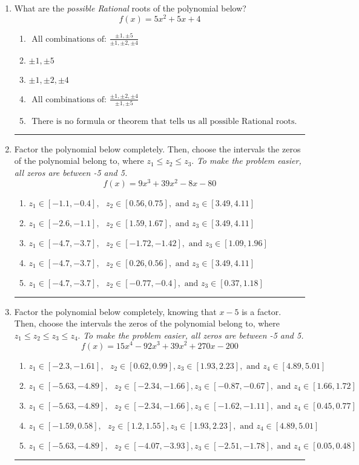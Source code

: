 \documentclass[14pt]{extbook}
\newcommand{\litem}[1]{\item#1\hspace*{-1cm}\rule{\textwidth}{0.4pt}}
\begin{document}
\begin{enumerate}
\litem{
What are the \textit{possible Rational} roots of the polynomial below?\[ f(x) = 5x^{2} +5 x + 4 \]\begin{enumerate}[label=\Alph*.]
\item \( \text{ All combinations of: }\frac{\pm 1,\pm 5}{\pm 1,\pm 2,\pm 4} \)
\item \( \pm 1,\pm 5 \)
\item \( \pm 1,\pm 2,\pm 4 \)
\item \( \text{ All combinations of: }\frac{\pm 1,\pm 2,\pm 4}{\pm 1,\pm 5} \)
\item \( \text{ There is no formula or theorem that tells us all possible Rational roots.} \)

\end{enumerate} }
\litem{
Factor the polynomial below completely. Then, choose the intervals the zeros of the polynomial belong to, where $z_1 \leq z_2 \leq z_3$. \textit{To make the problem easier, all zeros are between -5 and 5.}\[ f(x) = 9x^{3} +39 x^{2} -8 x -80 \]\begin{enumerate}[label=\Alph*.]
\item \( z_1 \in [-1.1, -0.4], \text{   }  z_2 \in [0.56, 0.75], \text{   and   } z_3 \in [3.49, 4.11] \)
\item \( z_1 \in [-2.6, -1.1], \text{   }  z_2 \in [1.59, 1.67], \text{   and   } z_3 \in [3.49, 4.11] \)
\item \( z_1 \in [-4.7, -3.7], \text{   }  z_2 \in [-1.72, -1.42], \text{   and   } z_3 \in [1.09, 1.96] \)
\item \( z_1 \in [-4.7, -3.7], \text{   }  z_2 \in [0.26, 0.56], \text{   and   } z_3 \in [3.49, 4.11] \)
\item \( z_1 \in [-4.7, -3.7], \text{   }  z_2 \in [-0.77, -0.4], \text{   and   } z_3 \in [0.37, 1.18] \)

\end{enumerate} }
\litem{
Factor the polynomial below completely, knowing that $x -5$ is a factor. Then, choose the intervals the zeros of the polynomial belong to, where $z_1 \leq z_2 \leq z_3 \leq z_4$. \textit{To make the problem easier, all zeros are between -5 and 5.}\[ f(x) = 15x^{4} -92 x^{3} +39 x^{2} +270 x -200 \]\begin{enumerate}[label=\Alph*.]
\item \( z_1 \in [-2.3, -1.61], \text{   }  z_2 \in [0.62, 0.99], z_3 \in [1.93, 2.23], \text{   and   } z_4 \in [4.89, 5.01] \)
\item \( z_1 \in [-5.63, -4.89], \text{   }  z_2 \in [-2.34, -1.66], z_3 \in [-0.87, -0.67], \text{   and   } z_4 \in [1.66, 1.72] \)
\item \( z_1 \in [-5.63, -4.89], \text{   }  z_2 \in [-2.34, -1.66], z_3 \in [-1.62, -1.11], \text{   and   } z_4 \in [0.45, 0.77] \)
\item \( z_1 \in [-1.59, 0.58], \text{   }  z_2 \in [1.2, 1.55], z_3 \in [1.93, 2.23], \text{   and   } z_4 \in [4.89, 5.01] \)
\item \( z_1 \in [-5.63, -4.89], \text{   }  z_2 \in [-4.07, -3.93], z_3 \in [-2.51, -1.78], \text{   and   } z_4 \in [0.05, 0.48] \)


\end{enumerate}}
\end{enumerate}
\end{document}
